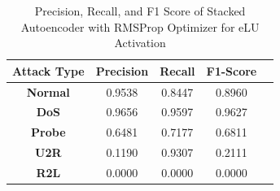\documentclass[12pt, a4paper]{report}
\begin{document}
\begin{table}[ht]
\centering
\captionsetup{justification=centering,margin=2cm}
\begin{tabular}{|c|c|c|c|c|}
\hline
\multicolumn{1}{|c|}{\textbf{Attack Type}} & \multicolumn{1}{c|}{\textbf{Precision}} & \multicolumn{1}{c|}{\textbf{Recall}} & \multicolumn{1}{c|}{\textbf{F1-Score}} \\ \hline
\textbf{Normal}        & 0.9538                                   & 0.8447                                & 0.8960                                                                  \\ \hline
\textbf{DoS}           & 0.9656                                  & 0.9597                                &  0.9627                                                                    \\ \hline
\textbf{Probe}         & 0.6481                                  & 0.7177                                & 0.6811                                                                  \\ \hline
\textbf{U2R}           & 0.1190                                    & 0.9307                                & 0.2111                                                                   \\ \hline
\textbf{R2L}           & 0.0000                                      & 0.0000                                   & 0.0000                                                            \\ \hline         \end{tabular}
\caption{Precision, Recall, and F1 Score of Stacked Autoencoder with RMSProp Optimizer for eLU Activation}
\label{prf1_rmsprop_elu_auto}
\end{table}
\clearpage
\end{document}
